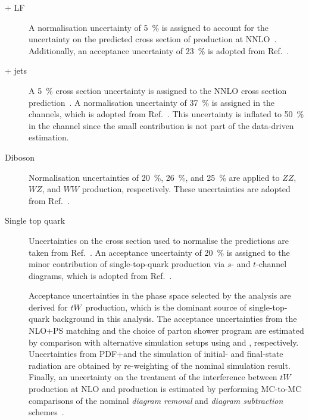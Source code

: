 \begin{description}

\item[\PZ + LF] A normalisation uncertainty of \SI{5}{\percent} is assigned to
  account for the uncertainty on the predicted cross section of \Zjets
  production at NNLO~\cite{Anastasiou:2003ds}. Additionally, an acceptance
  uncertainty of \SI{23}{\percent} is adopted from Ref.~\cite{HIGG-2018-51}.

\item[\PW + jets] A \SI{5}{\percent} cross section uncertainty is assigned to
  the NNLO cross section prediction~\cite{Anastasiou:2003ds}. A normalisation
  uncertainty of \SI{37}{\percent} is assigned in the \lephad channels, which is
  adopted from Ref.~\cite{HIGG-2018-51}. This uncertainty is inflated to
  \SI{50}{\percent} in the \hadhad channel since the small \Wjets contribution
  is not part of the data-driven \faketauhadvisC estimation.

\item[Diboson] Normalisation uncertainties of \SI{20}{\percent},
  \SI{26}{\percent}, and \SI{25}{\percent} are applied to $ZZ$, $WZ$, and $WW$
  production, respectively. These uncertainties are adopted from
  Ref.~\cite{HIGG-2018-51}.

\item[Single top quark] Uncertainties on the cross section used to normalise the
  predictions are taken from Ref.~\cite{stopxsec}. An acceptance uncertainty of
  \SI{20}{\percent} is assigned to the minor contribution of single-top-quark
  production via $s$- and $t$-channel diagrams, which is adopted from
  Ref.~\cite{HIGG-2018-51}.

  Acceptance uncertainties in the phase space selected by the analysis are
  derived for $tW$~production, which is the dominant source of single-top-quark
  background in this analysis. The acceptance uncertainties from the NLO+PS
  matching and the choice of parton shower program are estimated by comparison
  with alternative simulation setups using \MGNLO and \HERWIG[7],
  respectively. Uncertainties from PDF+\alphas and the simulation of initial-
  and final-state radiation are obtained by re-weighting of the nominal
  simulation result. Finally, an uncertainty on the treatment of the
  interference between $tW$ production at NLO and \ttbar production is estimated
  by performing MC-to-MC comparisons of the nominal \emph{diagram removal} and
  \emph{diagram subtraction} schemes~\cite{Frixione:2008yi}.


\end{description}
